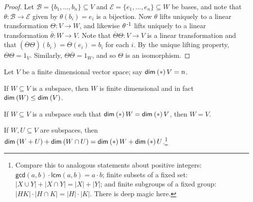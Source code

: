 \documentclass{memoir}
\begin{document}
\begin{proof}
Let $\mathcal{B} = \{b_1,\ldots,b_n\} \subseteq V$ and $\mathcal{E} = \{e_1,\ldots,e_n\} \subseteq W$ be bases, and note that $\theta : \mathcal{B} \rightarrow \mathcal{E}$ given by $\theta(b_i) = e_i$ is a bijection. Now $\theta$ lifts uniquely to a linear transformation $\Theta : V \rightarrow W$, and likewise $\theta^{{\,\text{-}1}}$ lifts uniquely to a linear transformation $\overline{\theta} : W \rightarrow V$. Note that $\overline{\Theta}\Theta : V \rightarrow V$ is a linear transformation and that $(\overline{\Theta}\Theta)(b_i) = \overline{\Theta}(e_i) = b_i$ for each $i$. By the unique lifting property, $\overline{\Theta}\Theta = 1_V$. Similarly, $\Theta\overline{\Theta} = 1_W$, and so $\Theta$ is an isomorphism.
\end{proof}

\begin{prp}
Let $V$ be a finite dimensional vector space; say $\operatorname{\mathsf{dim}}_{}\left(*\right){V} = n$.
\begin{enumerate*}
\item If $W \subseteq V$ is a subspace, then $W$ is finite dimensional and in fact $\operatorname{\mathsf{dim}}_{}\left(W\right) \leq \operatorname{\mathsf{dim}}_{}\left(V\right)$.
\item If $W \subseteq V$ is a subspace such that $\operatorname{\mathsf{dim}}_{}\left(*\right){W} = \operatorname{\mathsf{dim}}_{}\left(*\right){V}$, then $W = V$.
\item If $W,U \subseteq V$ are subspaces, then $\operatorname{\mathsf{dim}}_{}\left(W + U\right) + \operatorname{\mathsf{dim}}_{}\left(W \cap U\right) = \operatorname{\mathsf{dim}}_{}\left(*\right){W} + \operatorname{\mathsf{dim}}_{}\left(*\right){U}$.\footnote{Compare this to analogous statements about positive integers: $\mathsf{gcd}(a,b) \cdot \mathsf{lcm}(a,b) = a \cdot b$; finite subsets of a fixed set: $|X \cup Y| + |X \cap Y| = |X| + |Y|$; and finite subgroups of a fixed group: $|HK| \cdot |H \cap K| = |H| \cdot |K|$. There is deep magic here.}
\end{enumerate*}
\end{prp}
\end{document}
